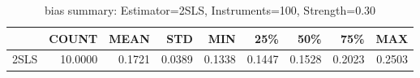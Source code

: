 \begin{table}[ht]
\centering
\caption{bias summary: Estimator=2SLS, Instruments=100, Strength=0.30}
\begin{tabular}{lrrrrrrrr}
\toprule
 & COUNT & MEAN & STD & MIN & 25\% & 50\% & 75\% & MAX \\
\midrule
2SLS & 10.0000 & 0.1721 & 0.0389 & 0.1338 & 0.1447 & 0.1528 & 0.2023 & 0.2503 \\
\bottomrule
\end{tabular}
\end{table}
